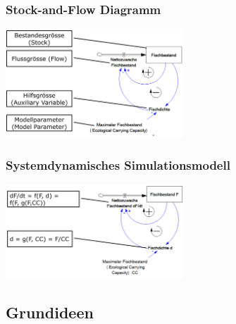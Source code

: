 \begin{multicols}{2}
	\subsubsection{Stock-and-Flow Diagramm}
	\includegraphics[width=0.5\textwidth]{pictures/stock_and_flow_diagramm}
	
	\subsubsection{Systemdynamisches Simulationsmodell}
	\includegraphics[width=0.5\textwidth]{pictures/systemdynamisches_simulationsmodell}
\end{multicols}	

\subsection{Grundideen}
